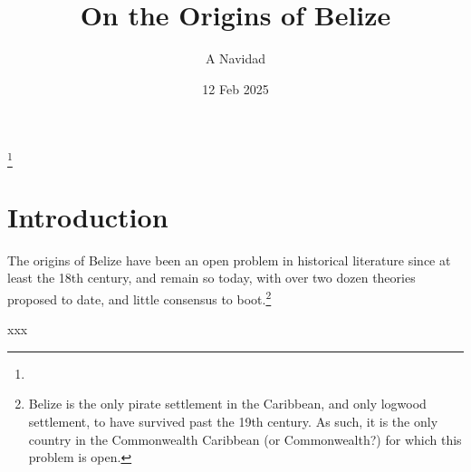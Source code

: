 \documentclass{amsart}
\theoremstyle{definition}
\theoremstyle{remark}
\begin{document}
%
%
\title{On the Origins of Belize}
\author{A Navidad}
\address{Harvard College, Cambridge, MA, US}
\date{12 Feb 2025}
\thanks{} %
\begin{abstract}
\end{abstract}
\keywords{}
\maketitle
%
%
%
\section{Introduction}
\label{s:intro}
	The origins of Belize have been an open problem in historical literature since at least the 18th century, and remain so today, with over two dozen theories proposed to date, and little consensus to boot.\footnote{Belize is the only pirate settlement in the Caribbean, and only logwood settlement, to have survived past the 19th century. As such, it is the only country in the Commonwealth Caribbean (or Commonwealth?) for which this problem is open.}
	
	xxx
%
%
%
\end{document}
